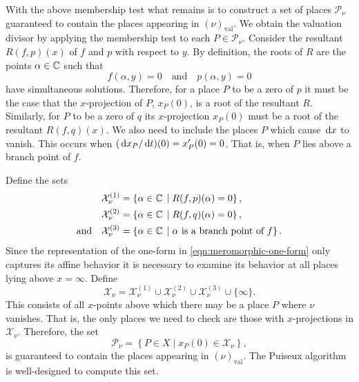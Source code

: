 With the above membership test what remains is to construct a set of places
$\mathcal{P}_\nu$ guaranteed to contain the places appearing in
$(\nu)_\text{val}$. We obtain the valuation divisor by applying the membership
test to each $P \in \mathcal{P}_\nu$. Consider the resultant $R(f,p)(x)$ of $f$
and $p$ with respect to $y$. By definition, the roots of $R$ are the points
$\alpha \in \operatorname{\mathbb{C}}$ such that
\begin{equation}
f(\alpha,y) = 0 \quad \text{and} \quad p(\alpha, y) = 0
\end{equation}
have simultaneous solutions. Therefore, for a place $P$ to be a zero of $p$ it
must be the case that the $x$-projection of $P$, $x_P(0)$, is a root of the
resultant $R$. Similarly, for $P$ to be a zero of $q$ its $x$-projection
$x_P(0)$ must be a root of the resultant $R(f,q)(x)$. We also need to include
the places $P$ which cause $\,\mathrm{d}x$ to vanish. This occurs when $(\,\mathrm{d}x_P/\,\mathrm{d}t)(0) =
x'_P(0) = 0$. That is, when $P$ lies above a branch point of $f$.

Define the sets
\begin{align}
  \mathcal{X}_\nu^{(1)}
  &=
  \left\{
  \alpha \in \operatorname{\mathbb{C}} \; | \; R(f,p)(\alpha) = 0
  \right\}, \notag \\
  \mathcal{X}_\nu^{(2)}
  &=
  \left\{
  \alpha \in \operatorname{\mathbb{C}} \; | \; R(f,q)(\alpha) = 0
  \right\}, \notag \\
  \text{and} \quad \mathcal{X}_\nu^{(3)}
  &=
  \left\{ \alpha \in \operatorname{\mathbb{C}} \; | \; \alpha \text{ is
    a branch point of $f$} \right\}.
\end{align}
Since the representation of the one-form in \eqref{eqn:meromorphic-one-form}
only captures its affine behavior it is necessary to examine its behavior at all
places lying above $x=\infty$. Define
\begin{equation}
\mathcal{X}_\nu
=
\mathcal{X}_\nu^{(1)} \cup
\mathcal{X}_\nu^{(2)} \cup
\mathcal{X}_\nu^{(3)} \cup
\{ \infty \}.
\end{equation}
This consists of all $x$-points above which there may be a place $P$ where $\nu$
vanishes. That is, the only places we need to check are those with
$x$-projections in $\mathcal{X}_\nu$. Therefore, the set
\begin{equation}
\mathcal{P}_\nu =
\left\{ P \in X \; | \; x_P(0) \in \mathcal{X}_\nu
\right\},
\end{equation}
is guaranteed to contain the places appearing in $(\nu)_\text{val}$. The Puiseux
algorithm is well-designed to compute this set.

